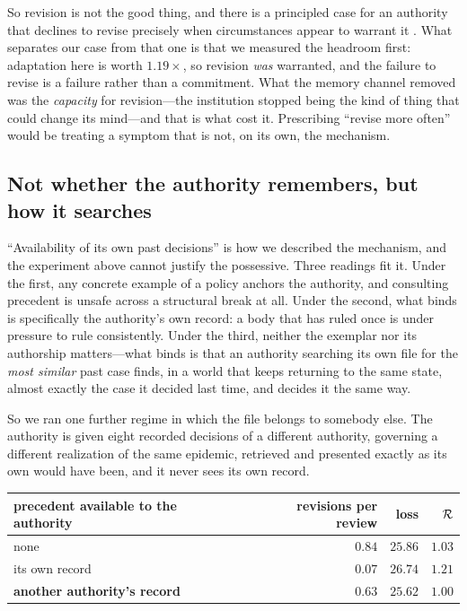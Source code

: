 \documentclass[11pt]{article}
\begin{document}
So revision is not the good thing, and there is a principled case for an authority that declines to
revise precisely when circumstances appear to warrant it \citep{kydland1977rules}. What separates our
case from that one is that we measured the headroom first: adaptation here is worth $1.19\times$, so
revision \emph{was} warranted, and the failure to revise is a failure rather than a commitment. What
the memory channel removed was the \emph{capacity} for revision---the institution stopped being the
kind of thing that could change its mind---and that is what cost it. Prescribing ``revise more
often'' would be treating a symptom that is not, on its own, the mechanism.

\subsection{Not whether the authority remembers, but how it searches}
\label{sec:foreign-social}

``Availability of its own past decisions'' is how we described the mechanism, and the experiment
above cannot justify the possessive. Three readings fit it. Under the first, any concrete example of
a policy anchors the authority, and consulting precedent is unsafe across a structural break at all.
Under the second, what binds is specifically the authority's own record: a body that has ruled once
is under pressure to rule consistently. Under the third, neither the exemplar nor its authorship
matters---what binds is that an authority searching its own file for the \emph{most similar} past
case finds, in a world that keeps returning to the same state, almost exactly the case it decided
last time, and decides it the same way.

So we ran one further regime in which the file belongs to somebody else. The authority is given eight
recorded decisions of a different authority, governing a different realization of the same epidemic,
retrieved and presented exactly as its own would have been, and it never sees its own record.

\begin{center}\small
\begin{tabular}{@{}lrrr@{}}
\toprule
precedent available to the authority & revisions per review & loss & $\mathcal{R}$ \\
\midrule
none & $0.84$ & $25.86$ & $1.03$ \\
its own record & $\mathbf{0.07}$ & $26.74$ & $1.21$ \\
\textbf{another authority's record} & $\mathbf{0.63}$ & $\mathbf{25.62}$ & $\mathbf{1.00}$ \\
\bottomrule
\end{tabular}
\end{center}
\end{document}
